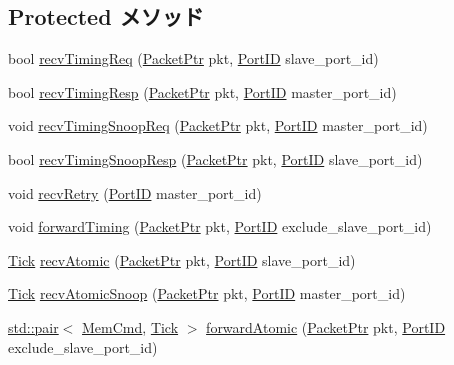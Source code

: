 \subsection*{Protected メソッド}
\begin{DoxyCompactItemize}
\item 
bool \hyperlink{classCoherentBus_a8e2d7ccc3adb605e763f2bd1c64e5128}{recvTimingReq} (\hyperlink{classPacket}{PacketPtr} pkt, \hyperlink{base_2types_8hh_acef4d7d41cb21fdc252e20c04cd7bb8e}{PortID} slave\_\-port\_\-id)
\item 
bool \hyperlink{classCoherentBus_a47ba09f9a3b3998cac9c14ab596a7515}{recvTimingResp} (\hyperlink{classPacket}{PacketPtr} pkt, \hyperlink{base_2types_8hh_acef4d7d41cb21fdc252e20c04cd7bb8e}{PortID} master\_\-port\_\-id)
\item 
void \hyperlink{classCoherentBus_a8a06090652319e21031b8bc2f8018e2b}{recvTimingSnoopReq} (\hyperlink{classPacket}{PacketPtr} pkt, \hyperlink{base_2types_8hh_acef4d7d41cb21fdc252e20c04cd7bb8e}{PortID} master\_\-port\_\-id)
\item 
bool \hyperlink{classCoherentBus_a29d5427944c6a4e363cf42eb70f480b1}{recvTimingSnoopResp} (\hyperlink{classPacket}{PacketPtr} pkt, \hyperlink{base_2types_8hh_acef4d7d41cb21fdc252e20c04cd7bb8e}{PortID} slave\_\-port\_\-id)
\item 
void \hyperlink{classCoherentBus_a96f9cd33bfb9a8b7fb2b25078eaf75a1}{recvRetry} (\hyperlink{base_2types_8hh_acef4d7d41cb21fdc252e20c04cd7bb8e}{PortID} master\_\-port\_\-id)
\item 
void \hyperlink{classCoherentBus_a63303c7524b820a7d0de62c07b097139}{forwardTiming} (\hyperlink{classPacket}{PacketPtr} pkt, \hyperlink{base_2types_8hh_acef4d7d41cb21fdc252e20c04cd7bb8e}{PortID} exclude\_\-slave\_\-port\_\-id)
\item 
\hyperlink{base_2types_8hh_a5c8ed81b7d238c9083e1037ba6d61643}{Tick} \hyperlink{classCoherentBus_ab0e34155d341f5561834eca8e4c97759}{recvAtomic} (\hyperlink{classPacket}{PacketPtr} pkt, \hyperlink{base_2types_8hh_acef4d7d41cb21fdc252e20c04cd7bb8e}{PortID} slave\_\-port\_\-id)
\item 
\hyperlink{base_2types_8hh_a5c8ed81b7d238c9083e1037ba6d61643}{Tick} \hyperlink{classCoherentBus_a533893555a1e2a7727e380a4747c33fb}{recvAtomicSnoop} (\hyperlink{classPacket}{PacketPtr} pkt, \hyperlink{base_2types_8hh_acef4d7d41cb21fdc252e20c04cd7bb8e}{PortID} master\_\-port\_\-id)
\item 
\hyperlink{classstd_1_1pair}{std::pair}$<$ \hyperlink{classMemCmd}{MemCmd}, \hyperlink{base_2types_8hh_a5c8ed81b7d238c9083e1037ba6d61643}{Tick} $>$ \hyperlink{classCoherentBus_aec73b2af9058f907bf2cf6c2773d46ba}{forwardAtomic} (\hyperlink{classPacket}{PacketPtr} pkt, \hyperlink{base_2types_8hh_acef4d7d41cb21fdc252e20c04cd7bb8e}{PortID} exclude\_\-slave\_\-port\_\-id)

\end{DoxyCompactItemize}
